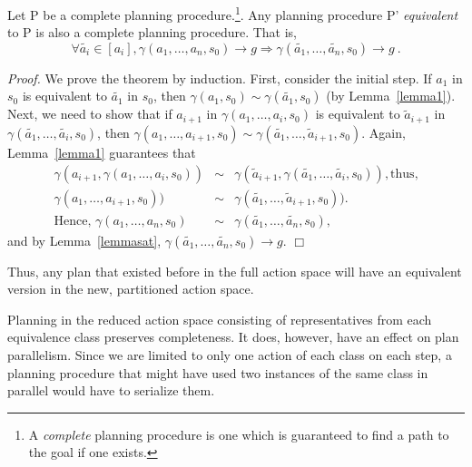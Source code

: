 \begin{thm} Let P be a complete planning procedure.\footnote{A
    \emph{complete} planning procedure is one which is guaranteed to
    find a path to the goal if one exists.}.
    Any planning procedure P' \emph{equivalent} to P is also a
complete planning procedure. That is,
\[ \forall \tilde{a_i} \in [a_i], \gamma(a_1,\ldots,a_n, s_0) \rightarrow g \Rightarrow \gamma( \tilde{a_1},\ldots,\tilde{a_n}, s_0)
\rightarrow g\ . \]
\label{theorem1}
\end{thm}
\vspace{0in}\emph{Proof.}
We prove the theorem by induction.  First, consider the initial
step. If $a_1$ in $s_0$ is equivalent to
$\tilde{a_1}$ in $s_0$, then
$\gamma(a_1, s_0) \sim \gamma(\tilde{a_1}, s_0) $
(by Lemma~\ref{lemma1}).
Next, we need to show that if $a_{i+1}$ in
$\gamma(a_1,\ldots,a_i,  s_0)$ is equivalent to $\tilde{a}_{i+1}$ in
  $\gamma(\tilde{a_1},\ldots,\tilde{a_i}, s_0)$, then
$\gamma(a_1,\ldots,a_{i+1},  s_0) \sim
\gamma(\tilde{a_1},\ldots,\tilde{a}_{i+1}, s_0)$.
Again, Lemma~\ref{lemma1} guarantees that 
\begin{eqnarray*}
 \gamma(a_{i+1}, \gamma(a_1,\ldots,a_i,  s_0)) & \sim &
 \gamma(\tilde{a}_{i+1}, \gamma(\tilde{a_1},\ldots,\tilde{a_i},  s_0)), \textrm{thus,}\\ 
 \gamma(a_1,\ldots,a_{i+1},  s_0)) & \sim &
 \gamma(\tilde{a_1},\ldots,\tilde{a}_{i+1},  s_0)).\\
\textrm{Hence, } \gamma(a_1,\ldots,a_n, s_0) & \sim &
\gamma(\tilde{a_1},\ldots,\tilde{a_n}, s_0),
\end{eqnarray*}and by
Lemma~\ref{lemmasat},
$\gamma(\tilde{a_1},\ldots,\tilde{a_n}, s_0) \rightarrow g$. \hfill$\Box$

Thus, any plan that existed before
in the full action space will have an equivalent version in the new, partitioned action
space.

Planning in the reduced action space consisting of representatives
 from each equivalence class preserves completeness.
 It does, however, have an effect on plan parallelism.  Since we are
 limited to only one action of each class on each step, a planning procedure that
 might have used two instances of the same class in parallel would
 have to serialize them.












